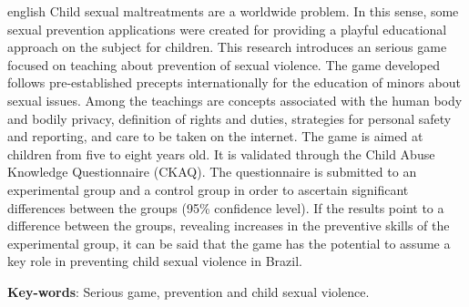 \begin{resumo}[Abstract]
 \begin{otherlanguage*}{english}
	Child sexual maltreatments are a worldwide problem. In this sense, some sexual prevention applications were created for providing a playful educational approach on the subject for children. This research introduces an serious game focused on teaching about prevention of sexual violence. The game developed follows pre-established precepts internationally for the education of minors about sexual issues. Among the teachings are concepts associated with the human body and bodily privacy, definition of rights and duties, strategies for personal safety and reporting, and care to be taken on the internet. The game is aimed at children from five to eight years old. It is validated through the Child Abuse Knowledge Questionnaire (CKAQ). The questionnaire is submitted to an experimental group and a control group in order to ascertain significant differences between the groups (95\% confidence level). If the results point to a difference between the groups, revealing increases in the preventive skills of the experimental group, it can be said that the game has the potential to assume a key role in preventing child sexual violence in Brazil.
   \vspace{\onelineskip}
 
   \noindent 
   \textbf{Key-words}: Serious game, prevention and child sexual violence.
 \end{otherlanguage*}
\end{resumo}

\listoffigures*
\cleardoublepage

\listoftables*
\cleardoublepage